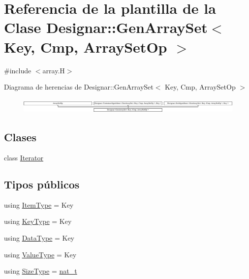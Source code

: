 \hypertarget{class_designar_1_1_gen_array_set}{}\section{Referencia de la plantilla de la Clase Designar\+:\+:Gen\+Array\+Set$<$ Key, Cmp, Array\+Set\+Op $>$}
\label{class_designar_1_1_gen_array_set}


{\ttfamily \#include $<$array.\+H$>$}

Diagrama de herencias de Designar\+:\+:Gen\+Array\+Set$<$ Key, Cmp, Array\+Set\+Op $>$\begin{figure}[H]
\begin{center}
\leavevmode
\includegraphics[height=0.782669cm]{class_designar_1_1_gen_array_set}
\end{center}
\end{figure}
\subsection*{Clases}
\begin{DoxyCompactItemize}
\item 
class \hyperlink{class_designar_1_1_gen_array_set_1_1_iterator}{Iterator}
\end{DoxyCompactItemize}
\subsection*{Tipos públicos}
\begin{DoxyCompactItemize}
\item 
using \hyperlink{class_designar_1_1_gen_array_set_a4db3cb71a2b2f88fee2a5f66688e5230}{Item\+Type} = Key
\item 
using \hyperlink{class_designar_1_1_gen_array_set_a21195191743cf71430c939225a2c8d60}{Key\+Type} = Key
\item 
using \hyperlink{class_designar_1_1_gen_array_set_ac69f0c0b76358cd5effd2dc05bd724ee}{Data\+Type} = Key
\item 
using \hyperlink{class_designar_1_1_gen_array_set_aef777cbce261e3d5df5f03c632a7c8c2}{Value\+Type} = Key
\item 
using \hyperlink{class_designar_1_1_gen_array_set_aabe7047d492721160f291bf40ecf7745}{Size\+Type} = \hyperlink{namespace_designar_aa72662848b9f4815e7bf31a7cf3e33d1}{nat\+\_\+t}
\end{DoxyCompactItemize}
